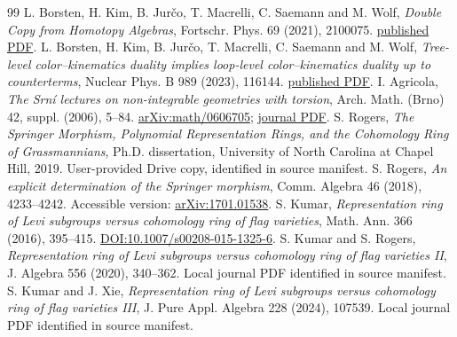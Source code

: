 \begin{thebibliography}{99}
 L. Borsten, H. Kim, B. Jur\v{c}o, T. Macrelli, C. Saemann and M. Wolf, \emph{Double Copy from Homotopy Algebras}, Fortschr. Phys. 69 (2021), 2100075. \href{https://pure.mpg.de/rest/items/item_3372386/component/file_3372387/content}{published PDF}.
 L. Borsten, H. Kim, B. Jur\v{c}o, T. Macrelli, C. Saemann and M. Wolf, \emph{Tree-level color--kinematics duality implies loop-level color--kinematics duality up to counterterms}, Nuclear Phys. B 989 (2023), 116144. \href{https://uhra.herts.ac.uk/id/eprint/10467/1/1-s2.0-S0550321323000731-main.pdf}{published PDF}.
 I. Agricola, \emph{The Srn\'i lectures on non-integrable geometries with torsion}, Arch. Math. (Brno) 42, suppl. (2006), 5--84. \href{https://arxiv.org/abs/math/0606705}{arXiv:math/0606705}; \href{https://www.dml.cz/bitstream/handle/10338.dmlcz/108020/ArchMathRetro_042-2006-5_1.pdf}{journal PDF}.
 S. Rogers, \emph{The Springer Morphism, Polynomial Representation Rings, and the Cohomology Ring of Grassmannians}, Ph.D. dissertation, University of North Carolina at Chapel Hill, 2019. User-provided Drive copy, identified in source manifest.
 S. Rogers, \emph{An explicit determination of the Springer morphism}, Comm. Algebra 46 (2018), 4233--4242. Accessible version: \href{https://arxiv.org/abs/1701.01538}{arXiv:1701.01538}.
 S. Kumar, \emph{Representation ring of Levi subgroups versus cohomology ring of flag varieties}, Math. Ann. 366 (2016), 395--415. \href{https://doi.org/10.1007/s00208-015-1325-6}{DOI:10.1007/s00208-015-1325-6}.
 S. Kumar and S. Rogers, \emph{Representation ring of Levi subgroups versus cohomology ring of flag varieties II}, J. Algebra 556 (2020), 340--362. Local journal PDF identified in source manifest.
 S. Kumar and J. Xie, \emph{Representation ring of Levi subgroups versus cohomology ring of flag varieties III}, J. Pure Appl. Algebra 228 (2024), 107539. Local journal PDF identified in source manifest.
\end{thebibliography}
